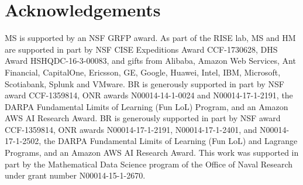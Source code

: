 \section*{Acknowledgements}
MS is supported by an NSF GRFP award. As part of the RISE lab, MS and HM are supported in part by NSF CISE Expeditions Award CCF-1730628, DHS Award HSHQDC-16-3-00083, and gifts from Alibaba, Amazon Web Services, Ant Financial, CapitalOne, Ericsson, GE, Google, Huawei, Intel, IBM, Microsoft, Scotiabank, Splunk and VMware. BR is generously supported in part by NSF award CCF-1359814, ONR awards N00014-14-1-0024 and N00014-17-1-2191, the DARPA Fundamental Limits of Learning (Fun LoL) Program, and an Amazon AWS AI Research Award. BR is generously supported in part by NSF award CCF-1359814, ONR awards N00014-17-1-2191, N00014-17-1-2401, and N00014-17-1-2502, the DARPA Fundamental Limits of Learning (Fun LoL) and Lagrange Programs, and an Amazon AWS AI Research Award. This work was supported in part by the Mathematical Data Science program of the
Office of Naval Research under grant number N00014-15-1-2670.